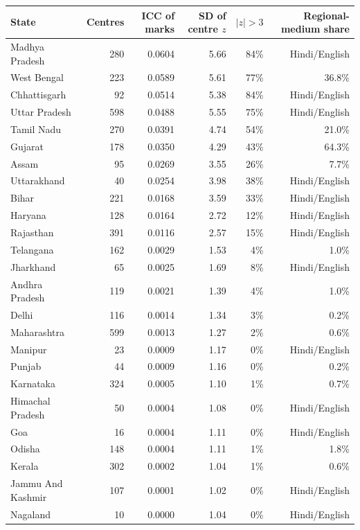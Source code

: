 {\scriptsize
\begin{tabular}{lrrrrr}
\toprule
State & Centres & ICC of marks & SD of centre $z$ & $|z|>3$ & Regional-medium share \\
\midrule
Madhya Pradesh & 280 & 0.0604 & 5.66 & 84\% & Hindi/English \\
West Bengal & 223 & 0.0589 & 5.61 & 77\% & 36.8\% \\
Chhattisgarh & 92 & 0.0514 & 5.38 & 84\% & Hindi/English \\
Uttar Pradesh & 598 & 0.0488 & 5.55 & 75\% & Hindi/English \\
Tamil Nadu & 270 & 0.0391 & 4.74 & 54\% & 21.0\% \\
Gujarat & 178 & 0.0350 & 4.29 & 43\% & 64.3\% \\
Assam & 95 & 0.0269 & 3.55 & 26\% & 7.7\% \\
Uttarakhand & 40 & 0.0254 & 3.98 & 38\% & Hindi/English \\
Bihar & 221 & 0.0168 & 3.59 & 33\% & Hindi/English \\
Haryana & 128 & 0.0164 & 2.72 & 12\% & Hindi/English \\
Rajasthan & 391 & 0.0116 & 2.57 & 15\% & Hindi/English \\
Telangana & 162 & 0.0029 & 1.53 & 4\% & 1.0\% \\
Jharkhand & 65 & 0.0025 & 1.69 & 8\% & Hindi/English \\
Andhra Pradesh & 119 & 0.0021 & 1.39 & 4\% & 1.0\% \\
Delhi & 116 & 0.0014 & 1.34 & 3\% & 0.2\% \\
Maharashtra & 599 & 0.0013 & 1.27 & 2\% & 0.6\% \\
Manipur & 23 & 0.0009 & 1.17 & 0\% & Hindi/English \\
Punjab & 44 & 0.0009 & 1.16 & 0\% & 0.2\% \\
Karnataka & 324 & 0.0005 & 1.10 & 1\% & 0.7\% \\
Himachal Pradesh & 50 & 0.0004 & 1.08 & 0\% & Hindi/English \\
Goa & 16 & 0.0004 & 1.11 & 0\% & Hindi/English \\
Odisha & 148 & 0.0004 & 1.11 & 1\% & 1.8\% \\
Kerala & 302 & 0.0002 & 1.04 & 1\% & 0.6\% \\
Jammu And Kashmir & 107 & 0.0001 & 1.02 & 0\% & Hindi/English \\
Nagaland & 10 & 0.0000 & 1.04 & 0\% & Hindi/English \\
\bottomrule
\end{tabular}}

